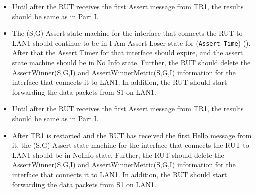 \documentclass[11pt]{report}
\begin{document}

\begin{itemize}

  \item Until after the RUT receives the first Assert message from TR1, the
  results should be same as in Part I.

  \item The (S,G) Assert state machine for the interface that connects the RUT
  to LAN1 should continue to be in I Am Assert Loser state for
  (\verb=Assert_Time=) ({\PimsmAssertTime}). After that the Assert Timer for
  that interface should expire, and the assert state machine should be in No
  Info state.
  Further, the RUT should delete the AssertWinner(S,G,I) and
  AssertWinnerMetric(S,G,I) information for the interface that connects it to
  LAN1.
  In addition, the RUT should start forwarding the data packets from S1 on
  LAN1.

\end{itemize}


\begin{itemize}

  \item Until after the RUT receives the first Assert message from TR1, the
  results should be same as in Part I.

  \item After TR1 is restarted and the RUT has received the first Hello
  message from it, the (S,G) Assert state machine for the
  interface that connects the RUT to LAN1 should be in NoInfo state.
  Further, the RUT should delete the AssertWinner(S,G,I) and
  AssertWinnerMetric(S,G,I) information for the interface that connects it to
  LAN1.
  In addition, the RUT should start forwarding the data packets from S1 on
  LAN1.

\end{itemize}

\end{document}
